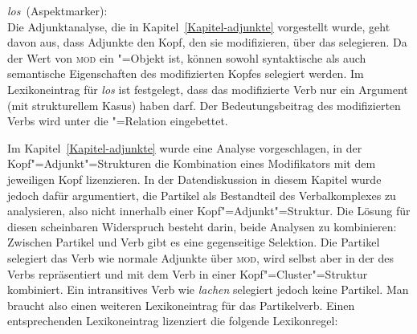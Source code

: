 \eas
\label{le-los-asp}
\mbox{\emph{los} (Aspektmarker):}\\
\zs{}
Die Adjunktanalyse, die in Kapitel~\ref{Kapitel-adjunkte} vorgestellt wurde,
geht davon aus, dass Adjunkte den Kopf, den sie modifizieren, über das \modm selegieren.
Da der Wert von \textsc{mod} ein "=Objekt ist, können sowohl syntaktische als auch semantische
Eigenschaften des modifizierten Kopfes selegiert werden. Im Lexikoneintrag für \emph{los}
ist festgelegt, dass das modifizierte Verb nur ein Argument (mit strukturellem Kasus)
haben darf. Der Bedeutungsbeitrag des modifizierten Verbs wird unter die "=Relation
eingebettet.

Im Kapitel~\ref{Kapitel-adjunkte} wurde eine Analyse vorgeschlagen,
in der Kopf"=Adjunkt"=Strukturen die Kombination eines Modifikators mit dem jeweiligen Kopf lizenzieren.
In der Datendiskussion in diesem Kapitel wurde jedoch dafür argumentiert,
die Partikel als Bestandteil des Verbalkomplexes zu analysieren, also nicht innerhalb einer
Kopf"=Adjunkt"=Struktur. Die Lösung für diesen scheinbaren Widerspruch besteht darin, beide Analysen zu kombinieren: Zwischen Partikel
und Verb gibt es eine gegenseitige Selektion. Die Partikel selegiert das Verb wie normale
Adjunkte über \textsc{mod}, wird selbst aber in der \compsl des Verbs repräsentiert und mit dem
Verb in einer Kopf"=Cluster"=Struktur kombiniert. Ein intransitives Verb wie \emph{lachen} selegiert
jedoch keine Partikel. Man braucht also einen weiteren Lexikoneintrag für das Partikelverb.
Einen entsprechenden Lexikoneintrag lizenziert die folgende Lexikonregel:

